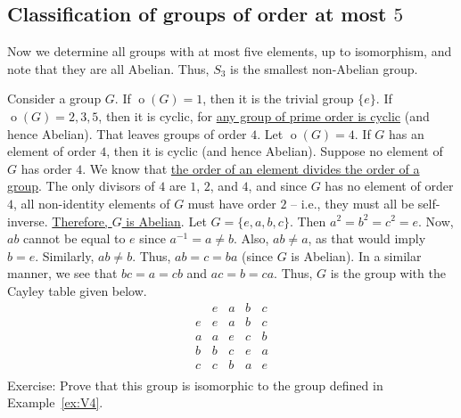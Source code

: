 \documentclass[svgnames]{article}
\theoremstyle{definition}
\theoremstyle{remark}
\DeclareMathOperator{\ord}{o}
\begin{document}
\begin{appendices}
\section{Classification of groups of order at most $5$}\label{sec:|G|<=5}
Now we determine all groups with at most five elements, up to isomorphism, and note that they are all Abelian. Thus, $S_3$ is the smallest non-Abelian group.

Consider a group $G$. If $\ord(G) = 1$, then it is the trivial group $\{e\}$. If $\ord(G) = 2, 3, 5$, then it is cyclic, for \hyperref[cor:Prime=>Cyc]{any group of prime order is cyclic} (and hence Abelian). That leaves groups of order $4$. Let $\ord(G) = 4$. If $G$ has an element of order $4$, then it is cyclic (and hence Abelian). Suppose no element of $G$ has order $4$. We know that \hyperref[cor:OrderElem]{the order of an element divides the order of a group}. The only divisors of $4$ are $1$, $2$, and $4$, and since $G$ has no element of order $4$, all non-identity elements of $G$ must have order $2$ -- i.e., they must all be self-inverse. \hyperref[it:Ord2=>Abelian]{Therefore, $G$ is Abelian}. Let $G = \{e, a, b, c\}$. Then $a^2 = b^2 = c^2 = e$. Now, $ab$ cannot be equal to $e$ since $a^{-1} = a \ne b$. Also, $ab \ne a$, as that would imply $b = e$. Similarly, $ab \ne b$. Thus, $ab = c = ba$ (since $G$ is Abelian). In a similar manner, we see that $bc = a = cb$ and $ac = b = ca$. Thus, $G$ is the group with the Cayley table given below.
\begin{equation*}
\begin{array}{r|cccc}
	&	e	&	a	&	b	&	c\\
\hline
e	&	e	&	a	&	b	&	c\\
a	&	a	&	e	&	c	&	b\\
b	&	b	&	c	&	e	&	a\\
c	&	c	&	b	&	a	&	e\\
\end{array}
\end{equation*}
{\small Exercise: Prove that this group is isomorphic to the group defined in Example~\ref{ex:V4}}.

\end{appendices}
\end{document}
